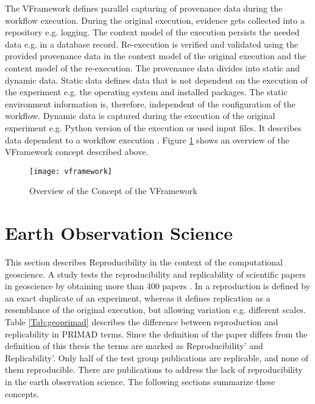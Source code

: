 \documentclass[draft,final]{vutinfth} %
\begin{document}
The VFramework defines parallel capturing of provenance data during the workflow execution. During the original execution, evidence gets collected into a repository e.g. logging. The context model of the execution persists the needed data e.g. in a database record. Re-execution is verified and validated using the provided provenance data in the context model of the original execution and the context model of the re-execution. The provenance data divides into static and dynamic data. Static data defines data that is not dependent on the execution of the experiment e.g. the operating system and installed packages. The static environment information is, therefore, independent of the configuration of the workflow. Dynamic data is captured during the execution of the original experiment e.g. Python version of the execution or used input files. It describes data dependent to a workflow execution \cite{Miksa2013FrameworkFV}. 
Figure \ref{fig:vframework} shows an overview of the VFramework concept described above.   
\begin{figure}[h]
	\centering
	\texttt{[image: vframework]}
	\caption{Overview of the Concept of the VFramework \cite{Miksa2013FrameworkFV}}
	\label{fig:vframework} %
\end{figure}

\section{Earth Observation Science}\label{EOScience}

This section describes Reproducibility in the context of the computational geoscience. A study tests the reproducibility and replicability of scientific papers in geoscience by obtaining more than 400 papers \cite{Ostermann2017AdvancingSW}. In \cite{Ostermann2017AdvancingSW} a reproduction is defined by an exact duplicate of an experiment, whereas it defines replication as a resemblance of the original execution, but allowing variation e.g. different scales. Table \ref{Tab:geoprimad} describes the difference between reproduction and replicability in PRIMAD terms. Since the definition of the paper differs from the definition of this thesis the terms are marked as Reproducibility' and Replicability'. Only half of the test group publications are replicable, and none of them reproducible. There are publications to address the lack of reproducibility in the earth observation science. The following sections summarize these concepts.     
\end{document}
